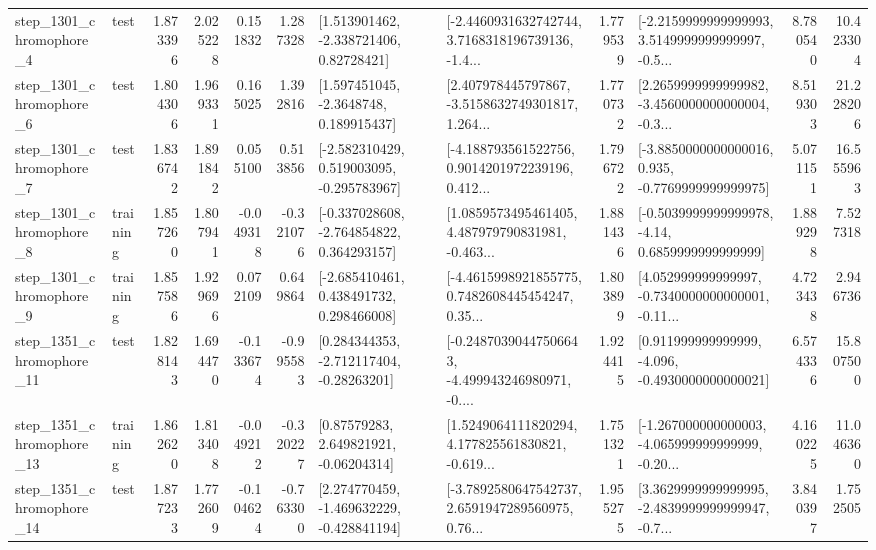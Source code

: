 \begin{tabular}{llrrrrllrlrr}
  step\_1301\_chromophore\_4 &      test &      1.873396 &    2.025228 &      0.151832 &  1.287328 &     [1.513901462, -2.338721406, 0.82728421] &  [-2.4460931632742744, 3.7168318196739136, -1.4... &       1.779539 &  [-2.2159999999999993, 3.5149999999999997, -0.5... &            8.780540 &         10.423304 \\
  step\_1301\_chromophore\_6 &      test &      1.804306 &    1.969331 &      0.165025 &  1.392816 &      [1.597451045, -2.3648748, 0.189915437] &  [2.407978445797867, -3.5158632749301817, 1.264... &       1.770732 &  [2.2659999999999982, -3.4560000000000004, -0.3... &            8.519303 &         21.228206 \\
  step\_1301\_chromophore\_7 &      test &      1.836742 &    1.891842 &      0.055100 &  0.513856 &   [-2.582310429, 0.519003095, -0.295783967] &  [-4.188793561522756, 0.9014201972239196, 0.412... &       1.796722 &  [-3.8850000000000016, 0.935, -0.7769999999999975] &            5.071151 &         16.555963 \\
  step\_1301\_chromophore\_8 &  training &      1.857260 &    1.807941 &     -0.049318 & -0.321076 &   [-0.337028608, -2.764854822, 0.364293157] &  [1.0859573495461405, 4.487979790831981, -0.463... &       1.881436 &   [-0.5039999999999978, -4.14, 0.6859999999999999] &            1.889298 &          7.527318 \\
  step\_1301\_chromophore\_9 &  training &      1.857586 &    1.929696 &      0.072109 &  0.649864 &    [-2.685410461, 0.438491732, 0.298466008] &  [-4.4615998921855775, 0.7482608445454247, 0.35... &       1.803899 &  [4.052999999999997, -0.7340000000000001, -0.11... &            4.723438 &          2.946736 \\
 step\_1351\_chromophore\_11 &      test &      1.828143 &    1.694470 &     -0.133674 & -0.995583 &    [0.284344353, -2.712117404, -0.28263201] &  [-0.24870390447506643, -4.499943246980971, -0.... &       1.924415 &   [0.911999999999999, -4.096, -0.4930000000000021] &            6.574336 &         15.807500 \\
 step\_1351\_chromophore\_13 &  training &      1.862620 &    1.813408 &     -0.049212 & -0.320227 &      [0.87579283, 2.649821921, -0.06204314] &  [1.5249064111820294, 4.177825561830821, -0.619... &       1.751321 &  [-1.267000000000003, -4.065999999999999, -0.20... &            4.160225 &         11.046360 \\
 step\_1351\_chromophore\_14 &      test &      1.877233 &    1.772609 &     -0.104624 & -0.763300 &   [2.274770459, -1.469632229, -0.428841194] &  [-3.7892580647542737, 2.6591947289560975, 0.76... &       1.955275 &  [3.3629999999999995, -2.4839999999999947, -0.7... &            3.840397 &          1.752505 \\

\end{tabular}
